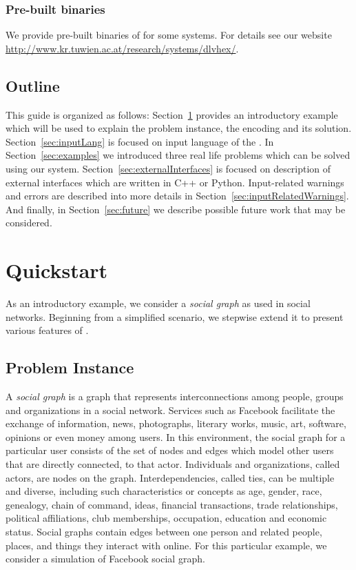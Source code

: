 \documentclass[14pt,a4paper, titlepage]{article}
\begin{document}
\subsubsection{Pre-built binaries}
We provide pre-built binaries of \dlvhex{} for some 
systems. For details see our website 
\url{http://www.kr.tuwien.ac.at/research/systems/dlvhex/}. 

\subsection{Outline}
This guide is organized as follows: Section~\ref{sec:quick} 
provides an introductory example which will be used to 
explain the problem instance, the encoding and its 
solution. Section~\ref{sec:inputLang} is focused on input 
language of the \dlvhex{}. In Section~\ref{sec:examples} we 
introduced three real life problems which can be solved 
using our system. Section~\ref{sec:externalInterfaces} is 
focused on description of external interfaces which are 
written in C++ or Python. Input-related warnings and errors 
are described into more details in 
Section~\ref{sec:inputRelatedWarnings}. And finally, in 
Section~\ref{sec:future} we describe possible future work 
that may be considered.

\section{Quickstart} %
\label{sec:quick}
As an introductory example, we consider a \emph{social 
graph} as used in social networks. Beginning from a 
simplified scenario, we stepwise extend it to present 
various features of \dlvhex{}.

\subsection{Problem Instance}
A \emph{social graph} is a graph that represents 
interconnections among people, groups 
and organizations in a social network. Services such as 
Facebook facilitate the exchange 
of information, news, photographs, literary works, music, 
art, software, opinions or even 
money among users. In this environment, the social graph 
for a particular user consists 
of the set of nodes and edges which model other users that 
are directly connected, to that actor. 
Individuals and organizations, called actors, are nodes on 
the graph. Interdependencies, 
called ties, can be multiple and diverse, including such 
characteristics or concepts as age, 
gender, race, genealogy, chain of command, ideas, financial 
transactions, trade relationships, 
political affiliations, club memberships, occupation, 
education and economic status. 
Social graphs contain edges between one person and related 
people, places, and things they interact 
with online. For this particular example, we consider a 
simulation of Facebook social graph. 
\end{document}
